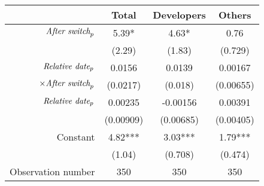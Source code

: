 \begin{tabular}{|r|c|c|c|}
\hline
&  Total & Developers & Others \\
\hline
$\mbox{\emph{After switch}}_p$ & 5.39* & 4.63* & 0.76 \\
 & (2.29) & (1.83) & (0.729) \\
\hline
$\mbox{\emph{Relative date}}_p$ & 0.0156 & 0.0139 & 0.00167 \\
$\times \mbox{\emph{After switch}}_p$ & (0.0217) & (0.018) & (0.00655) \\
\hline
$\mbox{\emph{Relative date}}_p$ & 0.00235 & -0.00156 & 0.00391 \\
 & (0.00909) & (0.00685) & (0.00405) \\
\hline
Constant & 4.82*** & 3.03*** & 1.79*** \\
 & (1.04) & (0.708) & (0.474) \\
\hline
Observation number & 350 & 350 & 350 \\
\hline
\end{tabular}